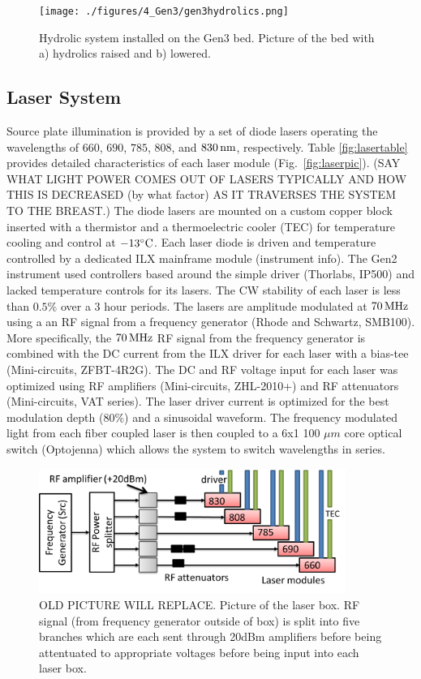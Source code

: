 \begin{figure}[ht]
\centering
\texttt{[image: ./figures/4\_Gen3/gen3hydrolics.png]}
\caption{Hydrolic system installed on the Gen3 bed. Picture of the bed with a) hydrolics raised and b) lowered.}
\label{fig:hydrolics}
\end{figure}

\subsection{Laser System}
Source plate illumination is provided by a set of diode lasers operating the wavelengths of $660$, $690$, $785$, $808$, and $830\,{\rm nm}$, respectively. Table \ref{fig:lasertable} provides detailed characteristics of each laser module (Fig.~\ref{fig:laserpic}). (SAY WHAT LIGHT POWER COMES OUT OF LASERS TYPICALLY AND HOW THIS IS DECREASED (by what factor) AS IT TRAVERSES THE SYSTEM TO THE BREAST.) The diode lasers are mounted on a custom copper block inserted with a thermistor and a thermoelectric cooler (TEC) for temperature cooling and control at $-13^{\circ}{\rm C}$. Each laser diode is driven and temperature controlled by a dedicated ILX mainframe module (instrument info). The Gen2 instrument used controllers based around the simple driver (Thorlabs, IP500) and lacked temperature controls for its lasers. The CW stability of each laser is less than $0.5\%$ over a 3 hour periods. The lasers are amplitude modulated at $70\,{\rm MHz}$ using a an RF signal from a frequency generator (Rhode and Schwartz, SMB100). More specifically, the $70\,{\rm MHz}$ RF signal from the frequency generator is combined with the DC current from the ILX driver for each laser with a bias-tee (Mini-circuits, ZFBT-4R2G). The DC and RF voltage input for each laser was optimized using RF amplifiers (Mini-circuits, ZHL-2010+) and RF attenuators (Mini-circuits, VAT series). The laser driver current is optimized for the best modulation depth ($80\%$) and a sinusoidal waveform. The frequency modulated light from each fiber coupled laser is then coupled to a 6x1 100 $\mu m$ core optical switch (Optojenna) which allows the system to switch wavelengths in series.
\begin{figure}[h]
\centering
\includegraphics[width=10cm]{./figures/4_Gen3/RFlaser.png}
\caption{OLD PICTURE WILL REPLACE. Picture of the laser box. RF signal (from frequency generator outside of box) is split into five branches which are each sent through 20dBm amplifiers before being attentuated to appropriate voltages before being input into each laser box.}
\label{fig:RFlaser}
\end{figure}


